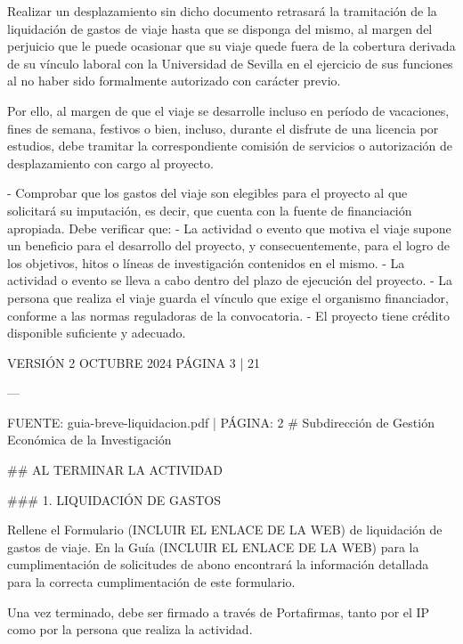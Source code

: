 \documentclass{article}
\begin{document}
\begin{itemize}
\begin{itemize}
\begin{scriptsize}
                  Realizar un desplazamiento sin dicho documento retrasará la tramitación de la liquidación de gastos de viaje hasta que se disponga del mismo, al margen del perjuicio que le puede ocasionar que su viaje quede fuera de la cobertura derivada de su vínculo laboral con la Universidad de Sevilla en el ejercicio de sus funciones al no haber sido formalmente autorizado con carácter previo.

                  Por ello, al margen de que el viaje se desarrolle incluso en período de vacaciones, fines de semana, festivos o bien, incluso, durante el disfrute de una licencia por estudios, debe tramitar la correspondiente comisión de servicios o autorización de desplazamiento con cargo al proyecto.

                  - Comprobar que los gastos del viaje son elegibles para el proyecto al que solicitará su imputación, es decir, que cuenta con la fuente de financiación apropiada. Debe verificar que:
                  - La actividad o evento que motiva el viaje supone un beneficio para el desarrollo del proyecto, y consecuentemente, para el logro de los objetivos, hitos o líneas de investigación contenidos en el mismo.
                  - La actividad o evento se lleva a cabo dentro del plazo de ejecución del proyecto.
                  - La persona que realiza el viaje guarda el vínculo que exige el organismo financiador, conforme a las normas reguladoras de la convocatoria.
                  - El proyecto tiene crédito disponible suficiente y adecuado.

                  VERSIÓN 2 OCTUBRE 2024    PÁGINA 3 | 21

                  ---

                  FUENTE: guia-breve-liquidacion.pdf | PÁGINA: 2
                  \# Subdirección de Gestión Económica de la Investigación

                  \#\# AL TERMINAR LA ACTIVIDAD

                  \#\#\# 1. LIQUIDACIÓN DE GASTOS

                  Rellene el Formulario (INCLUIR EL ENLACE DE LA WEB) de liquidación de gastos de viaje. En la Guía (INCLUIR EL ENLACE DE LA WEB) para la cumplimentación de solicitudes de abono encontrará la información detallada para la correcta cumplimentación de este formulario.

                  Una vez terminado, debe ser firmado a través de Portafirmas, tanto por el IP como por la persona que realiza la actividad.


\end{scriptsize}
\end{itemize}
\end{itemize}
\end{document}
